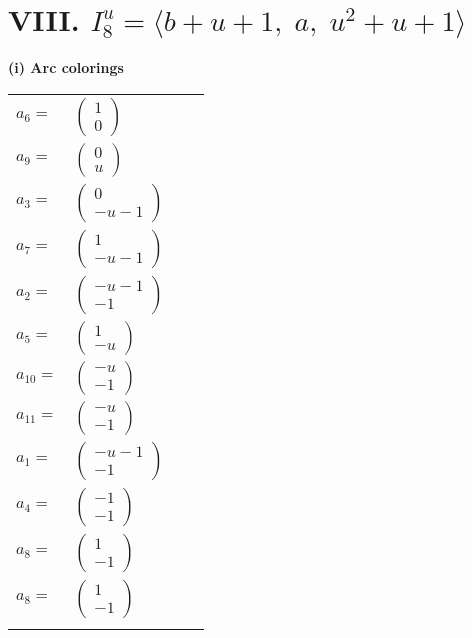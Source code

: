 \documentclass[1p]{elsarticle_modified}
\theoremstyle{definition}
\begin{document}
\centering \section*{VIII. $I^u_{8}= \langle b+u+1,\;a,\;u^2+u+1 \rangle$}
\flushleft \textbf{(i) Arc colorings}\\
\begin{tabular}{m{7pt} m{180pt} m{7pt} m{180pt} }
\flushright $a_{6}=$&$\begin{pmatrix}1\\0\end{pmatrix}$ \\
\flushright $a_{9}=$&$\begin{pmatrix}0\\u\end{pmatrix}$ \\
\flushright $a_{3}=$&$\begin{pmatrix}0\\- u-1\end{pmatrix}$ \\
\flushright $a_{7}=$&$\begin{pmatrix}1\\- u-1\end{pmatrix}$ \\
\flushright $a_{2}=$&$\begin{pmatrix}- u-1\\-1\end{pmatrix}$ \\
\flushright $a_{5}=$&$\begin{pmatrix}1\\- u\end{pmatrix}$ \\
\flushright $a_{10}=$&$\begin{pmatrix}- u\\-1\end{pmatrix}$ \\
\flushright $a_{11}=$&$\begin{pmatrix}- u\\-1\end{pmatrix}$ \\
\flushright $a_{1}=$&$\begin{pmatrix}- u-1\\-1\end{pmatrix}$ \\
\flushright $a_{4}=$&$\begin{pmatrix}-1\\-1\end{pmatrix}$ \\
\flushright $a_{8}=$&$\begin{pmatrix}1\\-1\end{pmatrix}$\\ \flushright $a_{8}=$&$\begin{pmatrix}1\\-1\end{pmatrix}$\\&\end{tabular}
\end{document}

